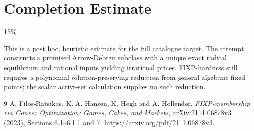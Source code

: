 \documentclass[11pt]{article}
\theoremstyle{definition}
\begin{document}
\section{Completion Estimate}
15\%

This is a post hoc, heuristic estimate for the full catalogue target.
The attempt constructs a promised Arrow-Debreu subclass with a unique exact radical equilibrium and rational inputs yielding irrational prices. FIXP-hardness still requires a polynomial solution-preserving reduction from general algebraic fixed points; the scalar active-set calculation supplies no such reduction.

\begin{thebibliography}{9}
 A. Filos-Ratsikas, K. A. Hansen, K. H\o gh and A. Hollender.
\emph{FIXP-membership via Convex Optimization: Games, Cakes, and Markets},
arXiv:2111.06878v3 (2023), Sections 6.1--6.1.1 and 7.
\url{https://arxiv.org/pdf/2111.06878v3}.
\end{thebibliography}
\end{document}
